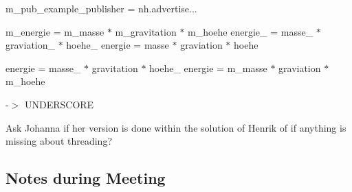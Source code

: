 m\+\_\+pub\+\_\+example\+\_\+publisher = nh.\+advertise...

m\+\_\+energie = m\+\_\+masse $\ast$ m\+\_\+gravitation $\ast$ m\+\_\+hoehe energie\+\_\+ = masse\+\_\+ $\ast$ graviation\+\_\+ $\ast$ hoehe\+\_\+ energie = masse $\ast$ graviation $\ast$ hoehe

energie = masse\+\_\+ $\ast$ gravitation $\ast$ hoehe\+\_\+ energie = m\+\_\+masse $\ast$ graviation $\ast$ m\+\_\+hoehe

-\/$>$ U\+N\+D\+E\+R\+S\+C\+O\+RE


\begin{DoxyItemize}
\item Ask Johanna if her version is done within the solution of Henrik of if anything is missing about threading? 


\end{DoxyItemize}

\subsection*{Notes during Meeting}


